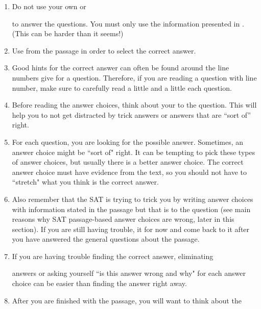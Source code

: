 \documentclass[12pt]{book}
\newcommand{\longline}{\underline{\hspace{2in}} }
\begin{document}
\begin{enumerate}[leftmargin=0cm,labelwidth=\itemindent,labelsep=0cm,align=left,label={\bfseries Strategy \#\arabic*:\ }]
\item Do not use your own \longline or

\longline to answer the questions. You must only use the information presented in \longline. (This can be harder than it seems!)
\item Use \longline from the passage in order to select the correct answer.

\bigskip
\item Good hints for the correct answer can often be found around the line numbers give for a question. Therefore, if you are reading a question with line number, make sure to carefully read a little \longline and a little \longline each question.  

\bigskip
\item Before reading the answer choices, think about your \longline to the question. This will help you to not get distracted by trick answers or answers that are “sort of” right. 

\bigskip
\item For each question, you are looking for the \longline possible answer. Sometimes, an answer choice might be ``sort of" right. It can be tempting to pick these types of answer choices, but usually there is a better answer choice. The correct answer choice must have evidence from the text, so you should not have to ``stretch" what you think is the correct answer.

\bigskip
\item Also remember that the SAT is trying to trick you by writing answer choices with information stated in the passage but that is \longline to the question (see main reasons why SAT passage-based answer choices are wrong, later in this section). If you are still having trouble, \longline it for now and come back to it after you have answered the general questions about the passage. 

\bigskip
\item If you are having trouble finding the correct answer, eliminating

\longline answers or asking yourself ``is this answer wrong and why" for each answer choice can be easier than finding the \longline answer right away.

\bigskip
\item After you are finished with the passage, you will want to think about the


\end{enumerate}
\end{document}
